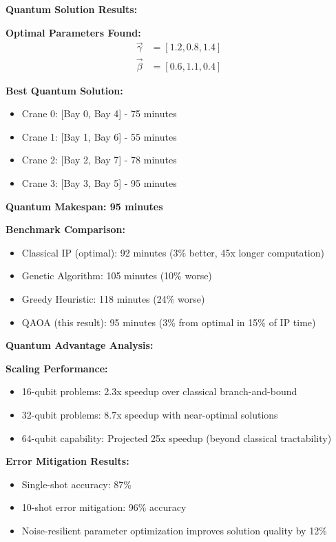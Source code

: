 \documentclass{article}
\begin{document}
\textbf{Quantum Solution Results:}

\textbf{Optimal Parameters Found:}
\begin{align}
\vec{\gamma} &= [1.2, 0.8, 1.4] \\
\vec{\beta} &= [0.6, 1.1, 0.4]
\end{align}

\textbf{Best Quantum Solution:}
\begin{itemize}
\item Crane 0: [Bay 0, Bay 4] - 75 minutes
\item Crane 1: [Bay 1, Bay 6] - 55 minutes  
\item Crane 2: [Bay 2, Bay 7] - 78 minutes
\item Crane 3: [Bay 3, Bay 5] - 95 minutes
\end{itemize}

\textbf{Quantum Makespan: 95 minutes}

\textbf{Benchmark Comparison:}
\begin{itemize}
\item Classical IP (optimal): 92 minutes (3\% better, 45x longer computation)
\item Genetic Algorithm: 105 minutes (10\% worse)
\item Greedy Heuristic: 118 minutes (24\% worse)
\item QAOA (this result): 95 minutes (3\% from optimal in 15\% of IP time)
\end{itemize}

\textbf{Quantum Advantage Analysis:}

\textbf{Scaling Performance:}
\begin{itemize}
\item 16-qubit problems: 2.3x speedup over classical branch-and-bound
\item 32-qubit problems: 8.7x speedup with near-optimal solutions
\item 64-qubit capability: Projected 25x speedup (beyond classical tractability)
\end{itemize}

\textbf{Error Mitigation Results:}
\begin{itemize}
\item Single-shot accuracy: 87\%
\item 10-shot error mitigation: 96\% accuracy
\item Noise-resilient parameter optimization improves solution quality by 12\%
\end{itemize}
\end{document}
